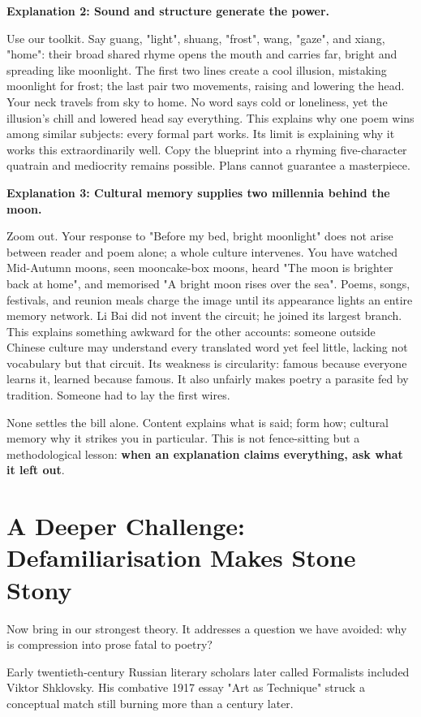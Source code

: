 \textbf{Explanation 2: Sound and structure generate the power.}

Use our toolkit. Say guang, "light", shuang, "frost", wang, "gaze", and xiang, "home": their broad shared rhyme opens the mouth and carries far, bright and spreading like moonlight. The first two lines create a cool illusion, mistaking moonlight for frost; the last pair two movements, raising and lowering the head. Your neck travels from sky to home. No word says cold or loneliness, yet the illusion's chill and lowered head say everything. This explains why one poem wins among similar subjects: every formal part works. Its limit is explaining why it works this extraordinarily well. Copy the blueprint into a rhyming five-character quatrain and mediocrity remains possible. Plans cannot guarantee a masterpiece.

\textbf{Explanation 3: Cultural memory supplies two millennia behind the moon.}

Zoom out. Your response to "Before my bed, bright moonlight" does not arise between reader and poem alone; a whole culture intervenes. You have watched Mid-Autumn moons, seen mooncake-box moons, heard "The moon is brighter back at home", and memorised "A bright moon rises over the sea". Poems, songs, festivals, and reunion meals charge the image until its appearance lights an entire memory network. Li Bai did not invent the circuit; he joined its largest branch. This explains something awkward for the other accounts: someone outside Chinese culture may understand every translated word yet feel little, lacking not vocabulary but that circuit. Its weakness is circularity: famous because everyone learns it, learned because famous. It also unfairly makes poetry a parasite fed by tradition. Someone had to lay the first wires.

None settles the bill alone. Content explains what is said; form how; cultural memory why it strikes you in particular. This is not fence-sitting but a methodological lesson: \textbf{when an explanation claims everything, ask what it left out}.

\section[Further Challenge: Defamiliarisation]{A Deeper Challenge: Defamiliarisation Makes Stone Stony}
Now bring in our strongest theory. It addresses a question we have avoided: why is compression into prose fatal to poetry?

Early twentieth-century Russian literary scholars later called Formalists included Viktor Shklovsky. His combative 1917 essay "Art as Technique" struck a conceptual match still burning more than a century later.

